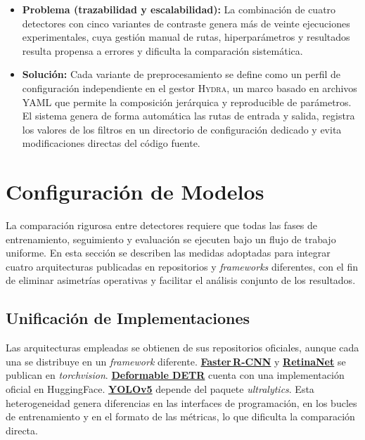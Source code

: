 \begin{itemize}
  \item \textbf{Problema (trazabilidad y escalabilidad):}
        La combinación de cuatro detectores con cinco variantes de contraste genera más de veinte ejecuciones experimentales, cuya gestión manual de rutas, hiperparámetros y resultados resulta propensa a errores y dificulta la comparación sistemática.
  \item \textbf{Solución:}
        Cada variante de preprocesamiento se define como un perfil de configuración independiente en el gestor \textsc{Hydra}, un marco basado en archivos YAML que permite la composición jerárquica y reproducible de parámetros.
        El sistema genera de forma automática las rutas de entrada y salida, registra los valores de los filtros en un directorio de configuración dedicado y evita modificaciones directas del código fuente.
\end{itemize}

\section{Configuración de Modelos}\label{sec:modelos}

La comparación rigurosa entre detectores requiere que todas las fases de entrenamiento, seguimiento y evaluación se ejecuten bajo un flujo de trabajo uniforme.
En esta sección se describen las medidas adoptadas para integrar cuatro arquitecturas publicadas en repositorios y \emph{frameworks} diferentes, con el fin de eliminar asimetrías operativas y facilitar el análisis conjunto de los resultados.

\subsection{Unificación de Implementaciones}\label{ssec:unify_impl}

Las arquitecturas empleadas se obtienen de sus repositorios oficiales, aunque cada una se distribuye en un \emph{framework} diferente.
\href{https://docs.pytorch.org/vision/main/models/generated/torchvision.models.detection.fasterrcnn_resnet50_fpn_v2.html}{\textbf{Faster\,R-CNN}} y \href{https://docs.pytorch.org/vision/main/models/generated/torchvision.models.detection.retinanet_resnet50_fpn_v2.html}{\textbf{RetinaNet}} se publican en \emph{torchvision}.
\href{https://huggingface.co/SenseTime/deformable-detr}{\textbf{Deformable DETR}} cuenta con una implementación oficial en HuggingFace.
\href{https://docs.ultralytics.com/models/yolov5/}{\textbf{YOLOv5}} depende del paquete \textit{ultralytics}.
Esta heterogeneidad genera diferencias en las interfaces de programación, en los bucles de entrenamiento y en el formato de las métricas, lo que dificulta la comparación directa.

